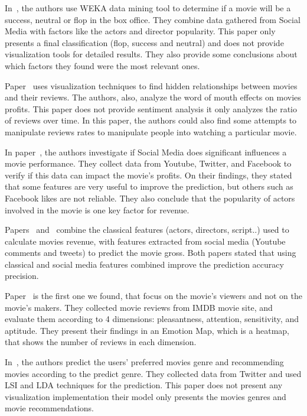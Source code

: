 In~\cite{2013weka}, the authors use WEKA data mining tool to determine if a movie will be a success, neutral or flop in the box office. They combine data gathered from Social Media with factors like the actors and director popularity. This paper only presents a final classification (flop, success and neutral) and does not provide visualization tools for detailed results. They also provide some conclusions about which factors they found were the most relevant ones.

Paper~\cite{VisualizationMovie} uses visualization techniques to find hidden relationships between movies and their reviews. The authors, also, analyze the word of mouth effects on movies profits. This paper does not provide sentiment analysis it only analyzes the ratio of reviews over time. In this paper, the authors could also find some attempts to manipulate reviews rates to manipulate people into watching a particular movie.

In paper~\cite{2014Influencesocialmedia}, the authors investigate if Social Media does significant influences a movie performance. They collect data from Youtube, Twitter, and Facebook to verify if this data can impact the movie's profits. On their findings, they stated that some features are very useful to improve the prediction, but others such as Facebook likes are not reliable. They also conclude that the popularity of actors involved in the movie is one key factor for revenue.

Papers~\cite{2015Crowd-Source} and~\cite{2015DifferentFactors} combine the classical features (actors, directors, script..) used to calculate movies revenue, with features extracted from social media (Youtube comments and tweets) to predict the movie gross. Both papers stated that using classical and social media features combined improve the prediction accuracy precision.

Paper~\cite{2016EmotionsIMDB} is the first one we found, that focus on the movie's viewers and not on the movie's makers. They collected movie reviews from IMDB movie site, and evaluate them according to 4 dimensions: pleasantness, attention, sensitivity, and aptitude. They present their findings in an Emotion Map, which is a heatmap, that shows the number of reviews in each dimension.

In~\cite{2016LSISVD}, the authors predict the users' preferred movies genre and recommending movies according to the predict genre. They collected data from Twitter and used LSI and LDA techniques for the prediction. This paper does not present any visualization implementation their model only presents the movies genres and movie recommendations. 
 
